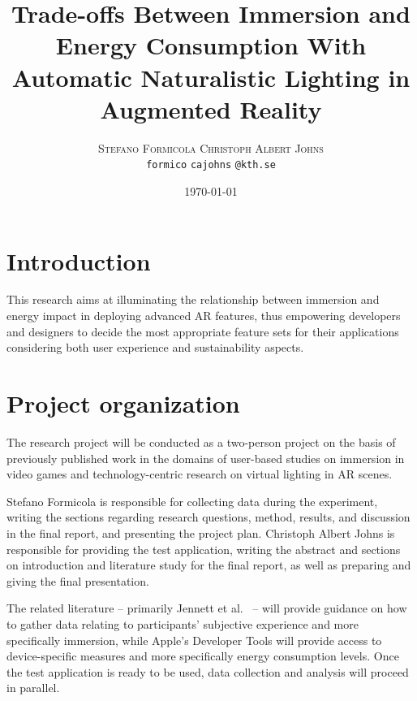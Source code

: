 \documentclass[12pt,twoside,english]{article}
\title{Trade-offs Between Immersion and Energy Consumption With Automatic Naturalistic Lighting in Augmented Reality}
\author{
        \textsc{Stefano Formicola}
            \qquad
        \textsc{Christoph Albert Johns}
        \mbox{}\\
        \normalsize
            \texttt{formico}
        \textbar{}
            \texttt{cajohns}
        \normalsize
            \texttt{@kth.se}
}
\date{\today}
\begin{document}
\maketitle






\section{Introduction}
\label{sect:introduction}

This research aims at illuminating the relationship between immersion and energy impact in deploying advanced \gls{AR} features, thus empowering developers and designers to decide the most appropriate feature sets for their applications considering both user experience and sustainability aspects.


\section{Project organization}
\label{sect:organization}

The research project will be conducted as a two-person project on the basis of previously published work in the domains of user-based studies on immersion in video games and technology-centric research on virtual lighting in \gls{AR} scenes.

Stefano Formicola is responsible for collecting data during the experiment, writing the sections regarding research questions, method, results, and discussion in the final report, and presenting the project plan.
Christoph Albert Johns is responsible for providing the test application, writing the abstract and sections on introduction and literature study for the final report, as well as preparing and giving the final presentation.

The related literature -- primarily Jennett et al.~\cite{jennett_measuring_2008} -- will provide guidance on how to gather data relating to participants' subjective experience and more specifically immersion, while Apple's Developer Tools will provide access to device-specific measures and more specifically energy consumption levels.
Once the test application is ready to be used, data collection and analysis will proceed in parallel.
\end{document}
